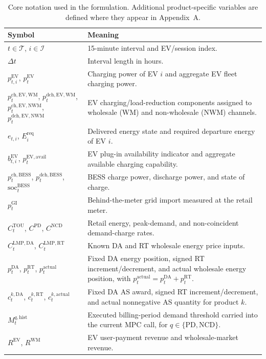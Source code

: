 \documentclass[final,5p,times]{elsarticle}
\newcommand{\DeltaT}{\Delta t}
\newcommand{\EV}{\mathrm{EV}}
\newcommand{\BESS}{\mathrm{BESS}}
\newcommand{\DA}{\mathrm{DA}}
\newcommand{\RT}{\mathrm{RT}}
\newcommand{\GI}{\mathrm{GI}}
\newcommand{\TOU}{\mathrm{TOU}}
\newcommand{\PD}{\mathrm{PD}}
\newcommand{\NCD}{\mathrm{NCD}}
\newcommand{\soc}{\mathrm{soc}}
\newcommand{\WM}{\mathrm{WM}}
\newcommand{\LMP}{\mathrm{LMP}}
\newcommand{\NWM}{\mathrm{NWM}}
\newcommand{\ch}{\mathrm{ch}}
\newcommand{\dch}{\mathrm{dch}}
\newcommand{\req}{\mathrm{req}}
\newcommand{\avail}{\mathrm{avail}}
\newcommand{\calT}{\mathcal{T}}
\newcommand{\calI}{\mathcal{I}}
\begin{document}
\begin{table}[!t]
\centering
\caption{Core notation used in the formulation. Additional product-specific variables are defined where they appear in Appendix~A.}
\label{tab:notation_core}
\scriptsize
\begin{tabularx}{\textwidth}{@{}p{}p{}@{}}
\toprule
Symbol & Meaning \\
\midrule
$t\in\calT$, $i\in\calI$ & 15-minute interval and EV/session index.\\
$\DeltaT$ & Interval length in hours.\\
$p_{t,i}^{\EV}$, $p_t^{\EV}$ & Charging power of EV $i$ and aggregate EV fleet charging power.\\
$p_t^{\ch,\EV,\WM}$, $p_t^{\dch,\EV,\WM}$, $p_t^{\ch,\EV,\NWM}$, $p_t^{\dch,\EV,\NWM}$ & EV charging/load-reduction components assigned to wholesale (WM) and non-wholesale (NWM) channels.\\
$e_{t,i}$, $E_i^{\req}$ & Delivered energy state and required departure energy of EV $i$.\\
$b_{t,i}^{\EV}$, $p_t^{\EV,\avail}$ & EV plug-in availability indicator and aggregate available charging capability.\\
$p_t^{\ch,\BESS}$, $p_t^{\dch,\BESS}$, $\soc_t^{\BESS}$ & BESS charge power, discharge power, and state of charge.\\
$p_t^{\GI}$ & Behind-the-meter grid import measured at the retail meter.\\
$C_t^{\TOU}$, $C^{\PD}$, $C^{\NCD}$ & Retail energy, peak-demand, and non-coincident demand-charge rates.\\
$C_t^{\LMP,\DA}$, $C_t^{\LMP,\RT}$ & Known DA and RT wholesale energy price inputs.\\
$p_t^{\DA}$, $p_t^{\RT}$, $p_t^{\mathrm{actual}}$ & Fixed DA energy position, signed RT increment/decrement, and actual wholesale energy position, with $p_t^{\mathrm{actual}}=p_t^{\DA}+p_t^{\RT}$.\\
$c_t^{k,\DA}$, $c_t^{k,\RT}$, $c_t^{k,\mathrm{actual}}$ & Fixed DA AS award, signed RT increment/decrement, and actual nonnegative AS quantity for product $k$.\\
$M_{t}^{q,\mathrm{hist}}$ & Executed billing-period demand threshold carried into the current MPC call, for $q\in\{\PD,\NCD\}$.\\
$R^{\EV}$, $R^{\WM}$ & EV user-payment revenue and wholesale-market revenue.\\
\bottomrule
\end{tabularx}
\end{table}
\end{document}
